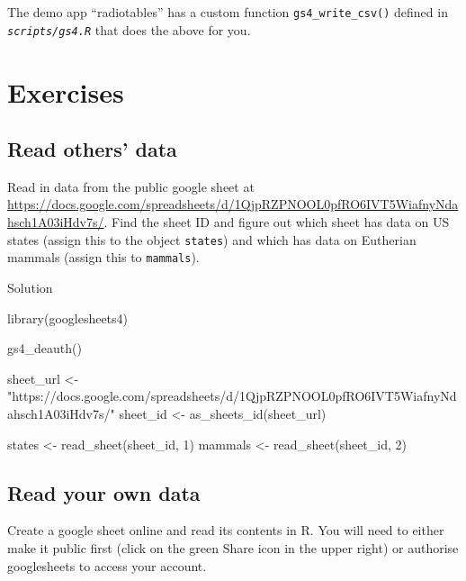 \documentclass[
  oneside]{book}
\newenvironment{Shaded}{\begin{snugshade}}{\end{snugshade}}
\newcommand{\DecValTok}[1]{\textcolor[rgb]{0.00,0.00,0.81}{#1}}
\newcommand{\FunctionTok}[1]{\textcolor[rgb]{0.00,0.00,0.00}{#1}}
\newcommand{\NormalTok}[1]{#1}
\newcommand{\OtherTok}[1]{\textcolor[rgb]{0.56,0.35,0.01}{#1}}
\newcommand{\StringTok}[1]{\textcolor[rgb]{0.31,0.60,0.02}{#1}}
\begin{document}
The demo app ``radiotables'' has a custom function \texttt{gs4\_write\_csv}\texttt{()} defined in \textit{\texttt{scripts/gs4.R}} that does the above for you.

\hypertarget{exercises-data}{%
\section{Exercises}\label{exercises-data}}

\hypertarget{read-others-data}{%
\subsection*{Read others' data}\label{read-others-data}}

Read in data from the public google sheet at \url{https://docs.google.com/spreadsheets/d/1QjpRZPNOOL0pfRO6IVT5WiafnyNdahsch1A03iHdv7s/}. Find the sheet ID and figure out which sheet has data on US states (assign this to the object \texttt{states}) and which has data on Eutherian mammals (assign this to \texttt{mammals}).

Solution

\begin{Shaded}
\begin{Highlighting}[]
\FunctionTok{library}\NormalTok{(googlesheets4)}

\FunctionTok{gs4\_deauth}\NormalTok{()}

\NormalTok{sheet\_url }\OtherTok{\textless{}{-}} \StringTok{"https://docs.google.com/spreadsheets/d/1QjpRZPNOOL0pfRO6IVT5WiafnyNdahsch1A03iHdv7s/"}
\NormalTok{sheet\_id }\OtherTok{\textless{}{-}} \FunctionTok{as\_sheets\_id}\NormalTok{(sheet\_url)}

\NormalTok{states }\OtherTok{\textless{}{-}} \FunctionTok{read\_sheet}\NormalTok{(sheet\_id, }\DecValTok{1}\NormalTok{)}
\NormalTok{mammals }\OtherTok{\textless{}{-}} \FunctionTok{read\_sheet}\NormalTok{(sheet\_id, }\DecValTok{2}\NormalTok{)}
\end{Highlighting}
\end{Shaded}

\hypertarget{read-your-own-data}{%
\subsection*{Read your own data}\label{read-your-own-data}}

Create a google sheet online and read its contents in R. You will need to either make it public first (click on the green Share icon in the upper right) or authorise googlesheets to access your account.
\end{document}
